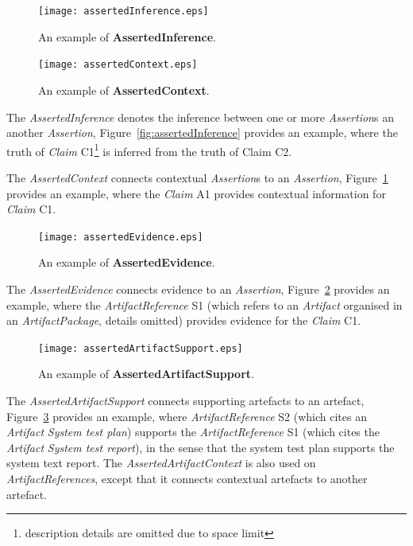 \begin{figure}
	\centering
	\begin{minipage}[b]{0.49\textwidth}
		\texttt{[image: assertedInference.eps]}
		\caption{An example of \textbf{AssertedInference}.}
		\label{fig:assertedInference}
	\end{minipage}
	\hfill
	\begin{minipage}[b]{0.49\textwidth}
		\texttt{[image: assertedContext.eps]}
		\caption{An example of \textbf{AssertedContext}.}
		\label{fig:assertedContext}
	\end{minipage}
\end{figure}

The \textit{AssertedInference} denotes the inference between one or more \textit{Assertion}s an another \textit{Assertion}, Figure~\ref{fig:assertedInference} provides an example, where the truth of \textit{Claim} C1\footnote{description details are omitted due to space limit} is inferred from the truth of Claim C2. 

The \textit{AssertedContext} connects contextual \textit{Assertion}s to an \textit{Assertion}, Figure~\ref{fig:assertedContext} provides an example, where the \textit{Claim} A1 provides contextual information for \textit{Claim} C1.

\begin{figure}
	\centering
	\texttt{[image: assertedEvidence.eps]}
	\caption{An example of \textbf{AssertedEvidence}.}
	\label{fig:assertedEvidence}
\end{figure}

The \textit{AssertedEvidence} connects evidence to an \textit{Assertion}, Figure~\ref{fig:assertedEvidence} provides an example, where the \textit{ArtifactReference} S1 (which refers to an \textit{Artifact} organised in an \textit{ArtifactPackage}, details omitted) provides evidence for the \textit{Claim} C1.

\begin{figure}
	\centering
	\texttt{[image: assertedArtifactSupport.eps]}
	\caption{An example of \textbf{AssertedArtifactSupport}.}
	\label{fig:assertedArtifactSupport}
\end{figure}

The \textit{AssertedArtifactSupport} connects supporting artefacts to an artefact, Figure~\ref{fig:assertedArtifactSupport} provides an example, where \textit{ArtifactReference} S2 (which cites an \textit{Artifact} \textit{System test plan}) supports the \textit{ArtifactReference} S1 (which cites the \textit{Artifact} \textit{System test report}), in the sense that the system test plan supports the system text report. 
The \textit{AssertedArtifactContext} is also used on \textit{ArtifactReferences}, except that it connects contextual artefacts to another artefact.

